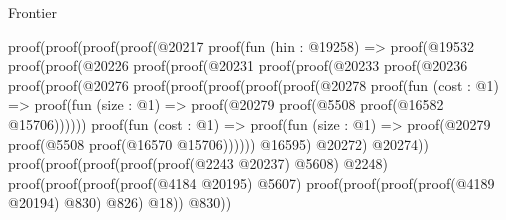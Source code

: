 \begin{lexlean}{Frontier}
\begin{coremodule}
          proof(proof(proof(proof(@20217
                    proof(fun (hin : @19258) =>
                      proof(@19532
                          proof(proof(@20226
                                proof(proof(@20231
                                      proof(proof(@20233
                                            proof(@20236
                                                proof(proof(@20276
                                                      proof(proof(proof(proof(proof(@20278
                                                                  proof(fun (cost : @1) =>
                                                                    proof(fun (size : @1) =>
                                                                      proof(@20279
                                                                          proof(@5508
                                                                              proof(@16582
                                                                                  @15706))))))
                                                                proof(fun (cost : @1) =>
                                                                  proof(fun (size : @1) =>
                                                                    proof(@20279
                                                                        proof(@5508
                                                                            proof(@16570
                                                                                @15706))))))
                                                              @16595)
                                                            @20272)
                                                          @20274))
                                                    proof(proof(proof(proof(proof(@2243 @20237)
                                                              @5608)
                                                            @2248)
                                                          proof(proof(proof(proof(@4184 @20195)
                                                                  @5607)
                                                                proof(proof(proof(proof(@4189
                                                                          @20194)
                                                                        @830)
                                                                      @826)
                                                                    @18))
                                                              @830))

\end{coremodule}
\end{lexlean}
